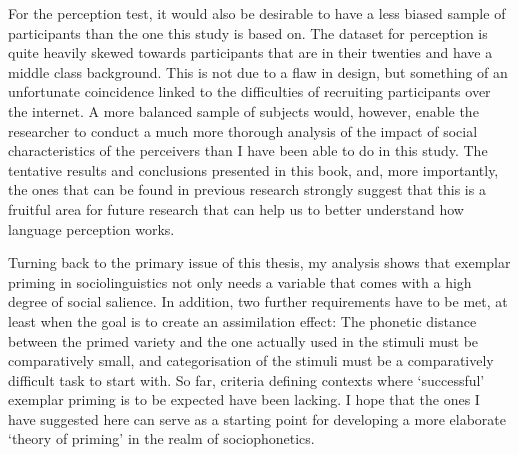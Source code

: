 For the perception test, it would also be desirable to have a less biased sample of participants than the one this study is based on.
The dataset for perception is quite heavily skewed towards participants that are in their twenties and have a middle class background.
This is not due to a flaw in design, but something of an unfortunate coincidence linked to the difficulties of recruiting participants over the internet.
A more balanced sample of subjects would, however, enable the researcher to conduct a much more thorough analysis of the impact of social characteristics of the perceivers than I have been able to do in this study.
The tentative results and conclusions presented in this book, and, more importantly, the ones that can be found in previous research \parencite[cf.][]{hayetal2006a,haydrager2010} strongly suggest that this is a fruitful area for future research that can help us to better understand how language perception works.

Turning back to the primary issue of this thesis, my analysis shows that exemplar priming in sociolinguistics not only needs a variable that comes with a high degree of social salience.
In addition, two further requirements have to be met, at least when the goal is to create an assimilation effect: 
The phonetic distance between the primed variety and the one actually used in the stimuli must be comparatively small, and categorisation of the stimuli must be a comparatively difficult task to start with.
So far, criteria defining contexts where `successful' exemplar priming is to be expected have been lacking.
I hope that the ones I have suggested here can serve as a starting point for developing a more elaborate `theory of priming' \parencite[cf.][]{cesario2014} in the realm of sociophonetics.